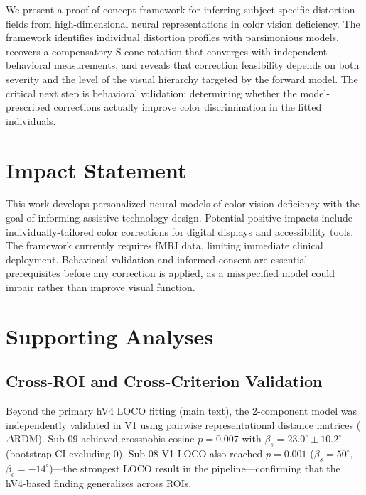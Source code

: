 \documentclass{article}
\begin{document}
We present a proof-of-concept framework for inferring subject-specific distortion fields from high-dimensional neural representations in color vision deficiency.
The framework identifies individual distortion profiles with parsimonious models, recovers a compensatory S-cone rotation that converges with independent behavioral measurements, and reveals that correction feasibility depends on both severity and the level of the visual hierarchy targeted by the forward model.
The critical next step is behavioral validation: determining whether the model-prescribed corrections actually improve color discrimination in the fitted individuals.

\section*{Impact Statement}

This work develops personalized neural models of color vision deficiency with the goal of informing assistive technology design.
Potential positive impacts include individually-tailored color corrections for digital displays and accessibility tools.
The framework currently requires fMRI data, limiting immediate clinical deployment.
Behavioral validation and informed consent are essential prerequisites before any correction is applied, as a misspecified model could impair rather than improve visual function.




\newpage
\appendix
\onecolumn

\section{Supporting Analyses}
\label{app:supporting}

\subsection{Cross-ROI and Cross-Criterion Validation}

Beyond the primary hV4 LOCO fitting (main text), the 2-component model was independently validated in V1 using pairwise representational distance matrices ($\Delta$RDM).
Sub-09 achieved crossnobis cosine $p = 0.007$ with $\beta_s = 23.0^\circ \pm 10.2^\circ$ (bootstrap CI excluding 0).
Sub-08 V1 LOCO also reached $p = 0.001$ ($\beta_s = 50^\circ$, $\beta_c = -14^\circ$)---the strongest LOCO result in the pipeline---confirming that the hV4-based finding generalizes across ROIs.
\end{document}

